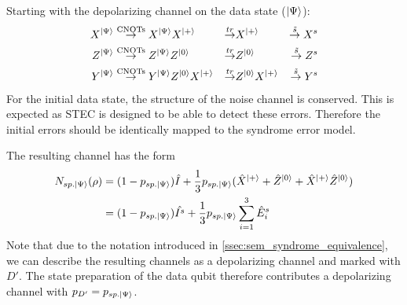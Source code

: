 Starting with the depolarizing channel on the data state ($\ket{\Psi}$):
\begin{align*}
    X^{\ket{\Psi}}  
    &\overset{\text{CNOTs}}{\rightarrow} X^{\ket{\Psi}} X^{\ket{+}} 
    &\overset{tr}{\rightarrow} &X^{\ket{+}}   
    &\overset{\tilde{s}}{\rightarrow} X^s  \\
    Z^{\ket{\Psi}}  
    &\overset{\text{CNOTs}}{\rightarrow} Z^{\ket{\Psi}} Z^{\ket{0}} 
    &\overset{tr}{\rightarrow} & Z^{\ket{0}}  
    &\overset{\tilde{s}}{\rightarrow} Z^s  \\
    Y^{\ket{\Psi}}  
    &\overset{\text{CNOTs}}{\rightarrow} Y^{\ket{\Psi}} Z^{\ket{0}} X^{\ket{+}}
    &\overset{tr}{\rightarrow} & Z^{\ket{0}} X^{\ket{+}} 
    &\overset{\tilde{s}}{\rightarrow} Y^s  \\
\end{align*} 
For the initial data state, the structure of the noise channel is conserved.
This is expected as STEC is designed to be able to detect these errors. 
Therefore the initial errors should be identically mapped to the syndrome error model.

The resulting channel has the form 
\begin{align*}
    N_{sp.\ket{\Psi}} (\rho) &= (1-p_{sp.\ket{\Psi}}) \hat{I} + \frac{1}{3}p_{sp.\ket{\Psi}}(\hat{X}^{\ket{+}} + \hat{Z}^{\ket{0}} + \hat{X}^{\ket{+}} \hat{Z}^{\ket{0}})\\
        &=  (1-p_{sp.\ket{\Psi}}) \hat{I^s} + \frac{1}{3} p_{sp.\ket{\Psi}}\sum_{i=1}^3 \hat{E}_{i}^s\\
\end{align*}
Note that due to the notation introduced in \ref{ssec:sem_syndrome_equivalence}, we can describe the resulting channels as a depolarizing channel and marked with $D'$.
The state preparation of the data qubit therefore contributes a depolarizing channel with $p_{D'} = p_{sp.\ket{\Psi}}$.

